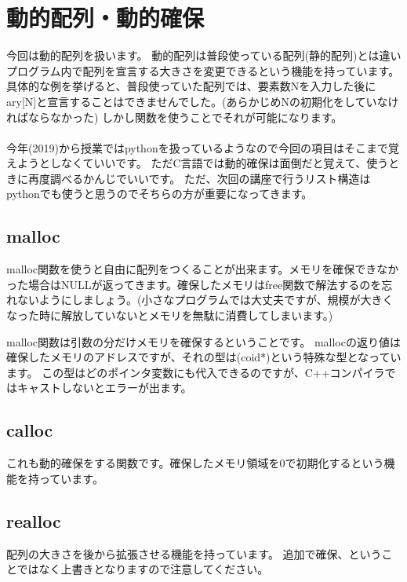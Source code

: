 \section{動的配列・動的確保}
今回は動的配列を扱います。
動的配列は普段使っている配列(静的配列)とは違いプログラム内で配列を宣言する大きさを変更できるという機能を持っています。
具体的な例を挙げると、普段使っていた配列では、要素数Nを入力した後にary[N]と宣言することはできませんでした。(あらかじめNの初期化をしていなければならなかった)
しかし関数を使うことでそれが可能になります。\\
\\

今年(2019)から授業ではpythonを扱っているようなので今回の項目はそこまで覚えようとしなくていいです。
ただC言語では動的確保は面倒だと覚えて、使うときに再度調べるかんじでいいです。
ただ、次回の講座で行うリスト構造はpythonでも使うと思うのでそちらの方が重要になってきます。

\subsection{malloc}
malloc関数を使うと自由に配列をつくることが出来ます。メモリを確保できなかった場合はNULLが返ってきます。確保したメモリはfree関数で解法するのを忘れないようにしましょう。(小さなプログラムでは大丈夫ですが、規模が大きくなった時に解放していないとメモリを無駄に消費してしまいます。)



malloc関数は引数の分だけメモリを確保するということです。
mallocの返り値は確保したメモリのアドレスですが、それの型は(coid*)という特殊な型となっています。
この型はどのポインタ変数にも代入できるのですが、C++コンパイラではキャストしないとエラーが出ます。

\subsection{calloc}
これも動的確保をする関数です。確保したメモリ領域を0で初期化するという機能を持っています。



\subsection{realloc}
配列の大きさを後から拡張させる機能を持っています。
追加で確保、ということではなく上書きとなりますので注意してください。

